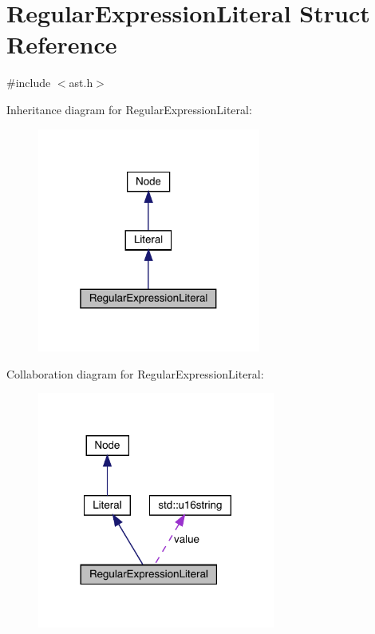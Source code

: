 \hypertarget{struct_regular_expression_literal}{}\section{Regular\+Expression\+Literal Struct Reference}
\label{struct_regular_expression_literal}


{\ttfamily \#include $<$ast.\+h$>$}



Inheritance diagram for Regular\+Expression\+Literal\+:\nopagebreak
\begin{figure}[H]
\begin{center}
\leavevmode
\includegraphics[width=208pt]{struct_regular_expression_literal__inherit__graph}
\end{center}
\end{figure}


Collaboration diagram for Regular\+Expression\+Literal\+:\nopagebreak
\begin{figure}[H]
\begin{center}
\leavevmode
\includegraphics[width=221pt]{struct_regular_expression_literal__coll__graph}
\end{center}
\end{figure}
